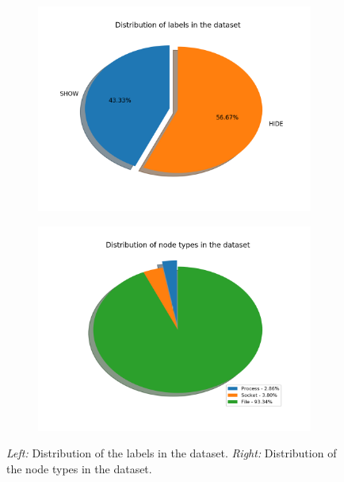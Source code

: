 		\begin{figure}[H]
			\centering
			\begin{subfigure}{.4\textwidth}
				\includegraphics[width=\textwidth]{graphics/labels-dist}
			\end{subfigure}
			\hfill
			\begin{subfigure}{.4\textwidth}
				\includegraphics[width=\textwidth]{graphics/node-dist}
			\end{subfigure}
			\caption[Distributions of labels and node type in the dataset]{\textit{Left:} Distribution of the labels in the dataset. \textit{Right: }Distribution of the node types in the dataset.}
			\label{Fig: eval/ml/methodology/dist}
		\end{figure} 
